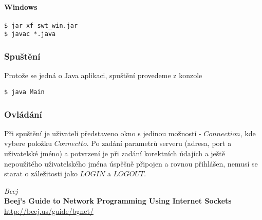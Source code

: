 \documentclass[12pt,titlepage]{article}
\begin{document}
\paragraph{Windows}
\begin{verbatim}
$ jar xf swt_win.jar
$ javac *.java
\end{verbatim}

\subsubsection{Spuštění}
Protože se jedná o Java aplikaci, spuštění provedeme z konzole 
\begin{verbatim}
$ java Main
\end{verbatim}

\subsubsection{Ovládání}
Při spuštění je uživateli představeno okno s jedinou možností - $Connection$,
kde vybere položku $Connect to$. Po zadání parametrů serveru (adresa, port a
uživatelské jméno) a potvrzení je při zadání korektních údajích a ještě
nepoužitého uživatelského jména úspěšně připojen a rovnou přihlášen, nemusí se
starat o záležitosti jako $LOGIN$ a $LOGOUT$.

\clearpage

\begin{thebibliography}{1}
{\em Beej} \\
{\bf Beej's Guide to Network Programming Using Internet Sockets} \\
\url{http://beej.us/guide/bgnet/}

\end{thebibliography}
\end{document}
